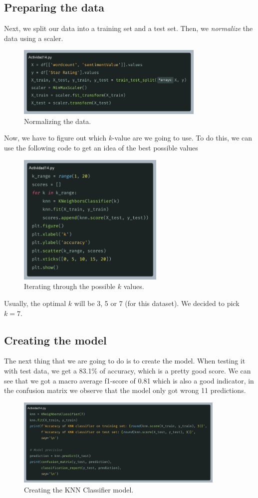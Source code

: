 \documentclass[10pt]{article}
\begin{document}
\subsection{Preparing the data}
Next, we split our data into a training set and a test set. Then, we \textit{normalize} the data using a scaler.
\begin{figure}[h]
    \centering
    \includegraphics[width=90mm]{2025-03-31-17-42-05.png}
    \caption{Normalizing the data.}
\end{figure}

\newpage
Now, we have to figure out which $k$-value are we going to use. To do this, we can use the following code to get an idea of the best possible values \par
\begin{figure}[h]
    \centering
    \includegraphics[width=70mm]{2025-03-31-17-48-31.png}
    \caption{Iterating through the possible $k$ values.}
\end{figure}
Usually, the optimal $k$ will be 3, 5 or 7 (for this dataset). We decided to pick $k=7$.

\subsection{Creating the model}
The next thing that we are going to do is to create the model. When testing it with test data, we get a 83.1\% of accuracy, which is a pretty good score. We can see that we got a macro average f1-score of 0.81 which is also a good indicator, in the confusion matrix we observe that the model only got wrong 11 predictions.
\begin{figure}[h]
    \centering
    \includegraphics[width=100mm]{2025-03-31-17-57-05.png}
    \caption{Creating the KNN Classifier model.}
\end{figure}
\end{document}
